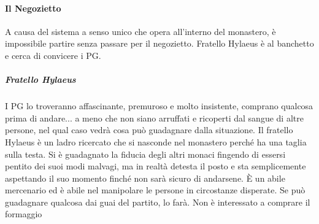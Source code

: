 \documentclass{article}
\begin{document}
\paragraph{Il Negozietto}
A causa del sistema a senso unico che opera all'interno del monastero, è impossibile partire senza passare per il negozietto. Fratello Hylaeus è al banchetto e cerca di convicere i PG. 
\subparagraph{Fratello Hylaeus} I PG lo troveranno affascinante, premuroso e molto insistente, comprano qualcosa prima di andare... a meno che non siano arruffati e ricoperti dal sangue di altre persone, nel qual caso vedrà cosa può guadagnare dalla situazione.
Il fratello Hylaeus è un ladro ricercato che si nasconde nel monastero perché ha una taglia sulla testa. Si è guadagnato la fiducia degli altri monaci fingendo di essersi pentito dei suoi modi malvagi, ma in realtà detesta il posto e sta semplicemente aspettando il suo momento finché non sarà sicuro di andarsene. È un abile mercenario ed è abile nel manipolare le persone in circostanze disperate. Se può guadagnare qualcosa dai guai del partito, lo farà. Non è interessato a comprare il formaggio
\end{document}
